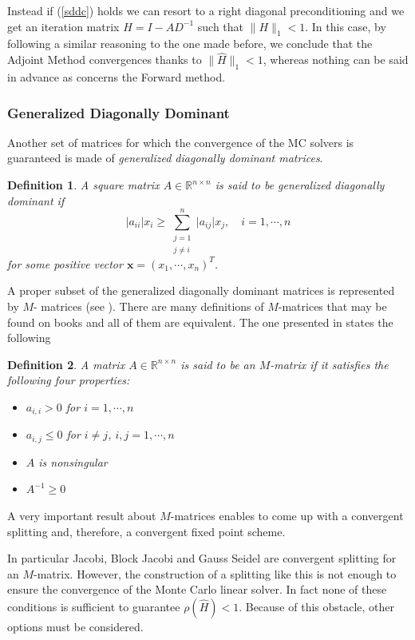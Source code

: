 \documentclass[a4paper,10pt]{article}
\newtheorem{defn}{Definition}
\begin{document}
Instead if (\ref{sddc}) holds we can resort to a right diagonal preconditioning
and we
get an iteration matrix $H=I-AD^{-1}$ such that $\lVert H \rVert_{1}<1$.
In this case, by following a similar reasoning to the one made before, we
conclude that the Adjoint Method convergences thanks to $\lVert
\hat{H}\rVert_1<1$,
whereas nothing can be said in advance as concerns the Forward method.

\subsubsection{Generalized Diagonally Dominant}

 Another set of matrices for which the convergence of
the MC solvers is guaranteed is made of \textit{generalized diagonally
dominant matrices}.

\begin{defn}
A square matrix $A\in\mathbb{R}^{n\times n}$ is said to be generalized
diagonally dominant if
\[
 \lvert a_{ii}\rvert x_i \ge \sum_{\substack{j=1\\j\ne i}}^n \lvert
a_{ij}\rvert
x_j, \quad i=1,\cdots,n
\]
for some positive vector $\mathbf{x}=(x_1,\cdots,x_n)^T$.
\end{defn}

A proper subset of the generalized diagonally dominant matrices is represented
by $M$- matrices (see \cite{Ax1996}).
There are many definitions of $M$-matrices that may be found on books and all
of them are equivalent. The one presented in \cite{Saad} states the
following

\begin{defn}
A matrix $A\in\mathbb{R}^{n\times n}$ is said to be an $M$-matrix if it
satisfies the following four properties:
\begin{itemize}
 \item $a_{i,i}>0$ for $i=1,\cdots,n$
 \item $a_{i,j}\le 0$ for $i\ne j$, $i,j=1,\cdots,n$
 \item $A$ is nonsingular
 \item $A^{-1}\ge 0$
\end{itemize}
\end{defn}


A very important result about $M$-matrices enables to come up with a convergent
splitting and, therefore, a convergent fixed point scheme.

In particular Jacobi, Block Jacobi and Gauss Seidel  are
convergent
splitting for an $M$-matrix.
However, the construction of a splitting like this is not enough to ensure the
convergence of
the Monte Carlo linear solver. In fact none of these conditions is sufficient
to guarantee $\rho(\hat{H})<1$. Because of this obstacle, other options must
be considered.\newline
\end{document}
